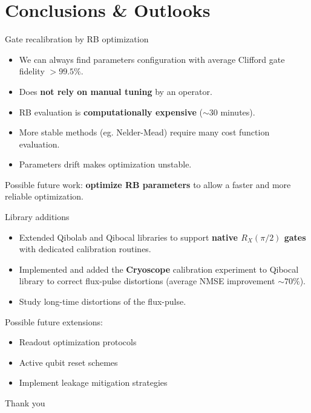 \documentclass[aspectratio=169,10pt]{beamer}
\begin{document}
\section{Conclusions \& Outlooks}

\begin{frame}{Gate recalibration by RB optimization}
  \begin{itemize}
    \item[\ding{51}] We can always find parameters configuration with average Clifford gate fidelity $> 99.5\%$.
    \item[\ding{51}] Does \textbf{not rely on manual tuning} by an operator.
    \item[\ding{55}] RB evaluation is \textbf{computationally expensive} ($\sim 30$ minutes).
    \item[\ding{55}] More stable methods (eg. Nelder-Mead) require many cost function evaluation.
    \item[\ding{55}] Parameters drift makes optimization unstable.
  \end{itemize}
  Possible future work: \textbf{optimize RB parameters} to allow a faster and more reliable optimization.
\end{frame}

\begin{frame}{Library additions}
  \begin{itemize}
    \item[\ding{51}] Extended Qibolab and Qibocal libraries to support \textbf{native $R_X(\pi/2)$ gates} with dedicated calibration routines.
    \item[\ding{51}] Implemented and added the \textbf{Cryoscope} calibration experiment to Qibocal library to correct flux-pulse distortions (average NMSE improvement $\sim 70\%$).
    \item[\ding{55}] Study long-time distortions of the flux-pulse.
  \end{itemize}
  Possible future extensions: 
  \begin{itemize}[label={\raisebox{0.2ex}{\tiny$\bullet$}}]
    \item Readout optimization protocols
    \item Active qubit reset schemes
    \item Implement leakage mitigation strategies
  \end{itemize}
\end{frame}

\begin{frame}[t,standout]
\Large
Thank you
\end{frame}
\end{document}
